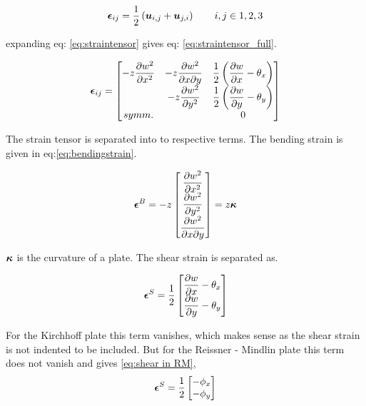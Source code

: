 \documentclass[main.tex]{subfiles}
\begin{document}
\begin{equation}\label{eq:straintensor}
\boldsymbol{\epsilon}_{ij} = \frac{1}{2} \left(  \boldsymbol{u}_{i,j} +  \boldsymbol{u}_{j,i} \right) \qquad i,j \in 1,2,3
\end{equation}

expanding eq: \ref{eq:straintensor} gives eq: \ref{eq:straintensor_full}.

\begin{align} \label{eq:straintensor_full}
\boldsymbol{\epsilon}_{ij} =  
\begin{bmatrix}
 -z \dfrac{\partial w^2 }{\partial x^2} 
 & 
 -z \dfrac{\partial w^2 }{\partial x \partial y}
 & 
 \dfrac{1}{2} \left( \dfrac{\partial w}{\partial x}-\theta_x \right)
 \\
 &
 -z \dfrac{\partial w^2 }{\partial y^2} 
 &
  \dfrac{1}{2} \left( \dfrac{\partial w}{\partial y}-\theta_y \right)
  \\
  symm.
  &
  &
  0
\end{bmatrix}
\end{align}

The strain tensor is separated into to respective terms. The bending strain is given in eq:\ref{eq:bendingstrain}. 

\begin{align}\label{eq:bendingstrain}
\boldsymbol{\epsilon}^B = -z
\begin{bmatrix}
\dfrac{\partial w^2 }{\partial x^2}
\\
\dfrac{\partial w^2 }{\partial y^2}
\\
\dfrac{\partial w^2 }{\partial x \partial y}
\end{bmatrix}
=
 z \boldsymbol{\kappa}
\end{align}

$\boldsymbol{\kappa}$ is the curvature of a plate. The shear strain is separated as.

\begin{align}
\boldsymbol{\epsilon}^S = \dfrac{1}{2}
\begin{bmatrix}
\dfrac{\partial w}{\partial x}-\theta_x 
\\
\dfrac{\partial w}{\partial y}-\theta_y 
\end{bmatrix}
\end{align}

For the Kirchhoff plate this term vanishes, which makes sense as the shear strain is not indented to be included. But for the Reissner - Mindlin plate this term does not vanish and gives \ref{eq:shear in RM}, 
\begin{align}\label{eq:shear in RM}
\boldsymbol{\epsilon}^S = \dfrac{1}{2}
\begin{bmatrix}
-\phi_x
\\
-\phi_y
\end{bmatrix}
\end{align}
\end{document}
